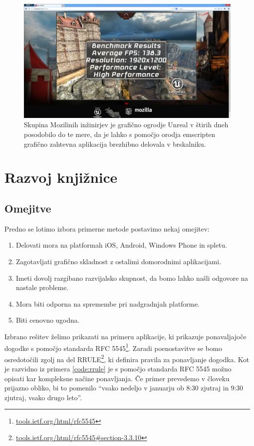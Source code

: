 \begin{figure}
 \includegraphics[width=\linewidth]{emscripten-epic-citadel}
 \caption{Skupina Mozilinih inžinirjev je grafično ogrodje Unreal v štirih dneh posodobilo do te mere, da je lahko s pomočjo orodja emscripten grafično zahtevna aplikacija brezhibno delovala v brskalniku.}
 \label{fig:epic-citadel}
\end{figure}

\chapter{Razvoj knjižnice}
\label{chap:development}

\section{Omejitve}

Predno se lotimo izbora primerne metode postavimo nekaj omejitev:

\begin{enumerate}
  \item Delovati mora na platformah iOS, Android, Windows Phone in spletu.
  \item Zagotavljati grafično skladnost z ostalimi domorodnimi aplikacijami.
  \item Imeti dovolj razgibano razvijalsko skupnost, da bomo lahko našli odgovore na nastale probleme.
  \item Mora biti odporna na spremembe pri nadgradnjah platforme.
  \item Biti cenovno ugodna.
\end{enumerate}

Izbrano rešitev želimo prikazati na primeru aplikacije, ki prikazuje ponavaljajoče dogodke s pomočjo standarda RFC 5545\footnote{\href{http://tools.ietf.org/html/rfc5545}{tools.ietf.org/html/rfc5545}}. Zaradi poenostavitve se bomo osredotočili zgolj na del RRULE{\footnote{\href{http://tools.ietf.org/html/rfc5545\#section-3.3.10}{tools.ietf.org/html/rfc5545\#section-3.3.10}}}, ki definira pravila za ponavljanje dogodka. Kot je razvidno iz primera \ref{code:rrule} je s pomočjo standarda RFC 5545 možno opisati kar kompleksne načine ponavljanja. Če primer prevedemo v človeku prijazno obliko, bi to pomenilo ``vsako nedeljo v januarju ob 8:30 zjutraj in 9:30 zjutraj, vsako drugo leto''.

